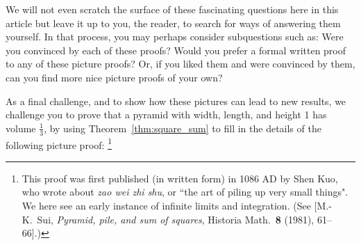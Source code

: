 We will not even scratch the surface of these fascinating questions here in this article
but leave it up to you, the reader, to search for ways of answering them yourself.
In that process,
you may perhaps consider subquestions
such as:
Were you convinced by each of these proofs?
Would you prefer a formal written proof to any of these picture proofs?
Or, if you liked them and were convinced by them,
can you find more nice picture proofs of your own?

As a final challenge, and to show how these pictures can lead to new results,
we challenge you to prove that a pyramid with width, length, and height 1 has volume $\frac{1}{3}$,
by using Theorem~\ref{thm:square_sum} to fill in the details of the following picture proof:%
\footnote{This proof was first published (in written form) in 1086 AD by Shen Kuo,
  who wrote about {\em zao wei zhi shu}, or ``the art of piling up very small things".
  We here see an early instance of infinite limits and integration.
  (See [M.-K.~Sui, {\sl Pyramid, pile, and sum of squares},
   Historia Math.~{\bf 8} (1981), 61--66].)}

\newcommand{\pyramidv}[1]{
  \foreach \x in {#1,...,1} {
    \fill[fill=white!50!gray,draw=black] (0,-\x*3*\zc) -- ++(0,2*\zc) -- ++(-\x*\xc,\x*\zc) -- ++(0,-2*\zc) -- cycle;
    \fill[fill=white!75!gray,draw=black] (0,-\x*3*\zc) -- ++(0,2*\zc) -- ++( \x*\xc,\x*\zc) -- ++(0,-2*\zc) -- cycle;
    \fill[fill=white        ,draw=black] (0,-\x*3*\zc+2*\zc) -- ++(\x*\xc,\x*\zc) -- ++(-\x*\xc,\x*\zc) -- ++(-\x*\xc,-\x*\zc) -- cycle;}}

\begin{center}
\end{center}
